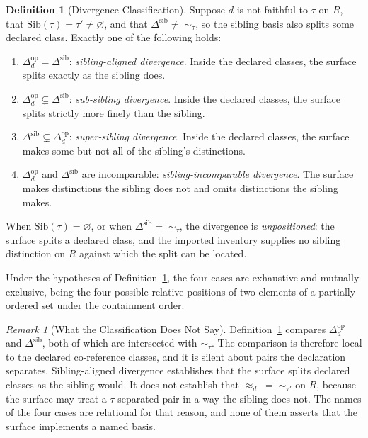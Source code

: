 \documentclass[11pt]{article}
\theoremstyle{plain}
\theoremstyle{definition}
\newtheorem{definition}[theorem]{Definition}
\theoremstyle{remark}
\newtheorem{remark}[theorem]{Remark}
\newcommand{\Sib}{\ensuremath{\mathrm{Sib}}}
\newcommand{\Ker}{\ensuremath{\mathrel{\approx_{d}}}}
\newcommand{\Dop}{\ensuremath{\Delta^{\mathrm{op}}_{d}}}
\newcommand{\Dsib}{\ensuremath{\Delta^{\mathrm{sib}}}}
\begin{document}
\begin{definition}[Divergence Classification]
  \label{oi.def.classification}
  Suppose \(d\) is not faithful to \(\tau\) on \(R\),
  that \(\Sib(\tau)=\tau'\neq\varnothing\),
  and that \(\Dsib\neq\;\sim_{\tau}\),
  so the sibling basis also splits some declared class.
  Exactly one of the following holds:
  \begin{enumerate}[label=(\alph*)]
    \item \(\Dop=\Dsib\):
          \emph{sibling-aligned divergence}.
          Inside the declared classes,
          the surface splits exactly as the sibling does.
    \item \(\Dop\subsetneq\Dsib\):
          \emph{sub-sibling divergence}.
          Inside the declared classes,
          the surface splits strictly more finely than the sibling.
    \item \(\Dsib\subsetneq\Dop\):
          \emph{super-sibling divergence}.
          Inside the declared classes,
          the surface makes some but not all of the sibling's distinctions.
    \item \(\Dop\) and \(\Dsib\) are incomparable:
          \emph{sibling-incomparable divergence}.
          The surface makes distinctions the sibling does not
          and omits distinctions the sibling makes.
  \end{enumerate}
  When \(\Sib(\tau)=\varnothing\), or when \(\Dsib=\;\sim_{\tau}\),
  the divergence is \emph{unpositioned}:
  the surface splits a declared class,
  and the imported inventory supplies no sibling distinction on \(R\)
  against which the split can be located.
\end{definition}

Under the hypotheses of Definition~\ref{oi.def.classification},
the four cases are exhaustive and mutually exclusive,
being the four possible relative positions
of two elements of a partially ordered set
under the containment order.

\begin{remark}[What the Classification Does Not Say]
  \label{oi.rem.local}
  Definition~\ref{oi.def.classification} compares
  \(\Dop\) and \(\Dsib\),
  both of which are intersected with \(\sim_{\tau}\).
  The comparison is therefore local to the declared co-reference classes,
  and it is silent about pairs the declaration separates.
  Sibling-aligned divergence establishes that
  the surface splits declared classes as the sibling would.
  It does not establish that
  \(\Ker\;=\;\sim_{\tau'}\) on \(R\),
  because the surface may treat a \(\tau\)-separated pair
  in a way the sibling does not.
  The names of the four cases are relational for that reason,
  and none of them asserts that the surface implements a named basis.
\end{remark}
\end{document}
